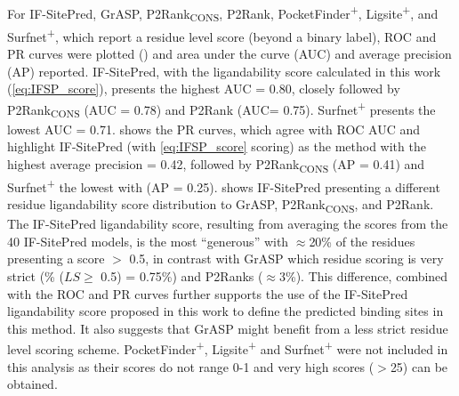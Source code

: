 For IF-SitePred, GrASP, P2Rank\textsubscript{CONS}, P2Rank, PocketFinder\textsuperscript{+}, Ligsite\textsuperscript{+}, and Surfnet\textsuperscript{+}, which report a residue level score (beyond a binary label), ROC and PR curves were plotted () and area under the curve (AUC) and average precision (AP) reported. IF-SitePred, with the ligandability score calculated in this work (\autoref{eq:IFSP_score}), presents the highest AUC = 0.80, closely followed by P2Rank\textsubscript{CONS} (AUC = 0.78) and P2Rank (AUC= 0.75). Surfnet\textsuperscript{+} presents the lowest AUC = 0.71.  shows the PR curves, which agree with ROC AUC and highlight IF-SitePred (with \autoref{eq:IFSP_score} scoring) as the method with the highest average precision = 0.42, followed by P2Rank\textsubscript{CONS} (AP = 0.41) and Surfnet\textsuperscript{+} the lowest with (AP = 0.25).  shows IF-SitePred presenting a different residue ligandability score distribution to GrASP, P2Rank\textsubscript{CONS}, and P2Rank. The IF-SitePred ligandability score, resulting from averaging the scores from the 40 IF-SitePred models, is the most ``generous'' with $\approx$20\% of the residues presenting a score $>$ 0.5, in contrast with GrASP which residue scoring is very strict (\% ($LS \geq$ 0.5) = 0.75\%) and P2Ranks ($\approx$3\%). This difference, combined with the ROC and PR curves further supports the use of the IF-SitePred ligandability score proposed in this work to define the predicted binding sites in this method. It also suggests that GrASP might benefit from a less strict residue level scoring scheme. PocketFinder\textsuperscript{+}, Ligsite\textsuperscript{+} and Surfnet\textsuperscript{+} were not included in this analysis as their scores do not range 0-1 and very high scores ($>$25) can be obtained.

